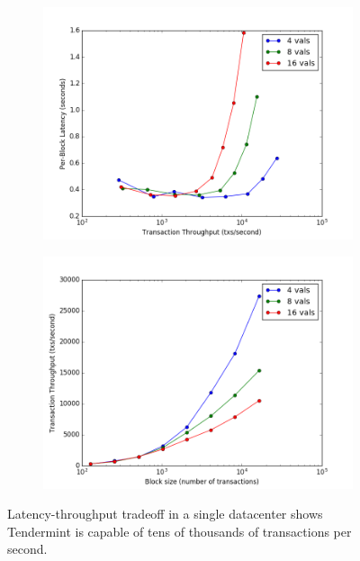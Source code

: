 \begin{figure}[]
	\centering
	\begin{subfigure}{0.8 \textwidth}
		\includegraphics[width=\linewidth,height=\textheight,keepaspectratio]{figures/throughput/single_datacenter/latency-throughput.png}
		\centering
	\end{subfigure}

	\begin{subfigure}{0.8 \textwidth}
		\includegraphics[width=\linewidth,height=\textheight,keepaspectratio]{figures/throughput/single_datacenter/throughput-blocksize.png}
	\end{subfigure}
	\caption[Latency-throughput tradeoff in non-faulty local network]{Latency-throughput tradeoff in a single datacenter shows Tendermint is capable of tens of thousands of transactions per second.}
	\label{fig:exp:throughput:single}
\end{figure}



